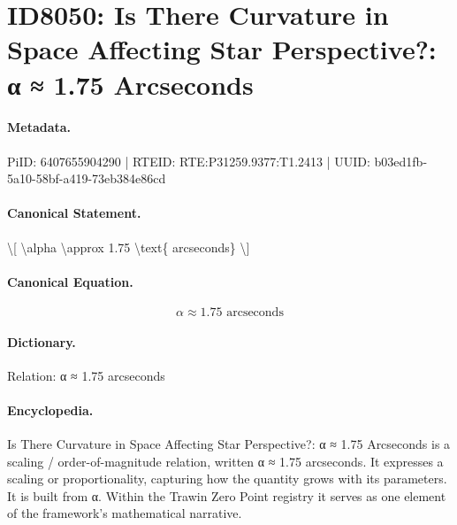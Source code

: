 \section*{ID8050: Is There Curvature in Space Affecting Star Perspective?: α ≈ 1.75 Arcseconds}
\paragraph{Metadata.}
PiID: 6407655904290 | RTEID: RTE:P31259.9377:T1.2413 | UUID: b03ed1fb-5a10-58bf-a419-73eb384e86cd

\paragraph{Canonical Statement.}
\textbackslash{}[ \textbackslash{}alpha \textbackslash{}approx 1.75 \textbackslash{}text\{ arcseconds\} \textbackslash{}]

\paragraph{Canonical Equation.}
\[
\alpha \approx 1.75 \text{ arcseconds}
\]

\paragraph{Dictionary.}
Relation: α ≈ 1.75 arcseconds

\paragraph{Encyclopedia.}
Is There Curvature in Space Affecting Star Perspective?: α ≈ 1.75 Arcseconds is a scaling / order-of-magnitude relation, written α ≈ 1.75 arcseconds. It expresses a scaling or proportionality, capturing how the quantity grows with its parameters. It is built from α. Within the Trawin Zero Point registry it serves as one element of the framework's mathematical narrative.
